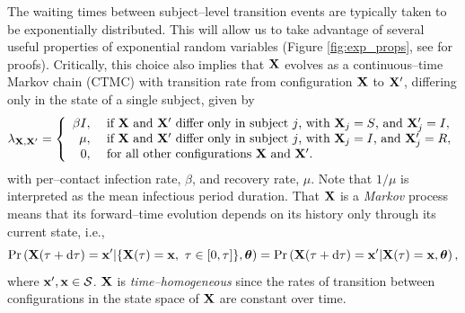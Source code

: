 The waiting times between subject--level transition events are typically taken to be exponentially distributed. This will allow us to take advantage of several useful properties of exponential random variables (Figure \ref{fig:exp_props}, see \cite{wilkinson2011stochastic} for proofs). Critically, this choice also implies that $ \mathbf{X} $ evolves as a continuous--time Markov chain (CTMC) with transition rate from configuration $ \mathbf{X} $ to $ \mathbf{X}^\prime $, differing only in the state of a single subject, given by
\begin{equation}
\lambda_{\mathbf{X},\mathbf{X}^\prime} = \left \lbrace \begin{array}{rl}
\beta I,\ &\text{if } \mathbf{X}\ \text{and } \mathbf{X}^\prime\ \text{differ only in subject }j \text{, with }\mathbf{X}_j=S\text{, and }\mathbf{X}_j^\prime=I,\\
\mu,\ &\text{if } \mathbf{X}\ \text{and } \mathbf{X}^\prime\ \text{differ only in subject }j \text{, with }\mathbf{X}_j=I\text{, and }\mathbf{X}_j^\prime=R,\\
0,\ & \text{for all other configurations }\mathbf{X}\ \text{and }\mathbf{X}^\prime.
\end{array}\right.
\end{equation}
with per--contact infection rate,  $ \beta $, and recovery rate, $ \mu $. Note that $ 1/\mu $ is interpreted as the mean infectious period duration. That $ \mathbf{X} $ is a \textit{Markov} process means that its forward--time evolution depends on its history only through its current state, i.e.,
\begin{equation}
\label{eqn:sir_markov}
\Pr\left (\bX(\tau + \dtau) = \bx^\prime | \lbrace\bX(\tau) = \bx,\ \tau\in[0,\tau]\rbrace, \btheta\right ) = \Pr\left (\bX(\tau + \dtau) = \bx^\prime | \bX(\tau) = \bx,\btheta\right ),
\end{equation}
where $ \mathbf{x}^\prime,\mathbf{x} \in \mathcal{S}$. $ \mathbf{X} $ is \textit{time--homogeneous} since the rates of transition between configurations in the state space of $ \mathbf{X} $ are constant over time. 

